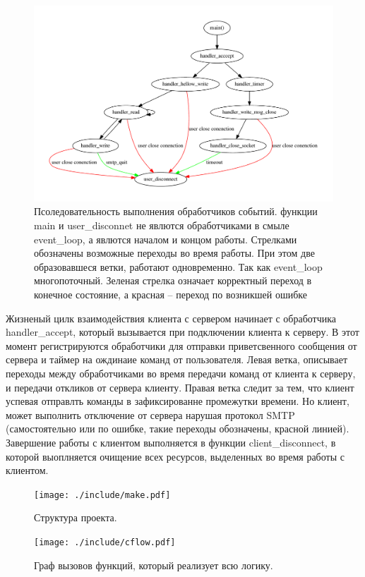 \documentclass[a4paper,12pt]{report}
\begin{document}
	 	\begin{figure}[H]
		\centering
		\includegraphics[width=\textwidth]{./resource/handlers.pdf}
		\caption{Псоледовательность выполнения обработчиков событий. функции main и user\_disconnet не явлются обработчиками в смыле event\_loop, а явлются началом и концом работы.  Стрелками обозначены возможные переходы во время работы. При этом две образовавшеся ветки, работают одновременно. Так как event\_loop многопоточный. Зеленая стрелка означает корректный переход в конечное состояние, а красная -- переход по возникшей ошибке} \label{fig:ProgLogic}
	\end{figure}
	Жизненый цилк взаимодействия клиента с сервером начинает с обработчика handler\_accept, который вызывается при подключении клиента к серверу. В этот момент регистрируются обработчики для отправки приветсвенного сообщения от сервера и таймер на ождинаие команд от пользователя. Левая ветка, описывает переходы между обработчиками во время передачи команд от клиента к серверу, и передачи откликов от сервера клиенту. Правая ветка следит за тем, что клиент успевая отправлть команды в зафиксированне промежутки времени. Но клиент, может выполнить отключение от сервера нарушая протокол SMTP (самостоятельно или по ошибке, такие переходы обозначены, красной линией). Завершение работы с клиентом выполняется в функции client\_disconnect, в которой выоплняется очищение всех ресурсов, выделенных во время работы с клиентом.

	\begin{figure}[H]
	\centering
	\texttt{[image: ./include/make.pdf]}
	\caption{Структура проекта.}
	\label{fig:make_server}
	\end{figure}

	
	\begin{figure}[H]
	\centering
	\texttt{[image: ./include/cflow.pdf]}
	\caption{Граф вызовов функций, который реализует всю логику.}
	\label{fig:event}
	\end{figure}
\end{document}
